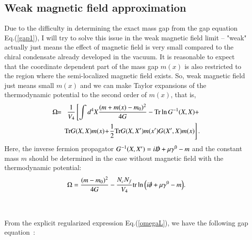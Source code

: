 \documentclass[aps,prd,amsmath,two column,amssymb,showpacs]{revtex4}
\begin{document}
\subsection{Weak magnetic field approximation}\label{WB}
Due to the difficulty in determining the exact mass gap from the gap equation Eq.(\ref{gap1}), I will try to solve this issue in the weak magnetic field limit -- "weak" actually just means the effect of magnetic field is very small compared to the chiral condensate already developed in the vacuum. It is reasonable to expect that the coordinate dependent part of the mass gap $m(x)$ is also restricted to the region where the semi-localized magnetic field exists. So, weak magnetic field just means small $m(x)$ and we can make Taylor expansions of the thermodynamic potential to the second order of $m(x)$, that is,
\begin{eqnarray}
\Omega\!\!&=&\!\!{1\over V_4}\left[\int d^4X{(m+m(x)-m_0)^2\over4G}-{\rm Tr}\ln G^{-1}(X,X)+\right.\nonumber\\
&&\!\!\!\!\left.{\rm Tr}G(X,X)m(x)\!+\!{1\over2}{\rm Tr}G(X,X')m(x')G(X',X)m(x)\right].
\end{eqnarray}
Here, the inverse fermion propagator $G^{-1}(X,X')=i\slashed{D}+\mu\gamma^0-m$ and the constant mass $m$ should be determined in the case without magnetic field with the thermodynamic potential:
\begin{eqnarray}
\Omega={(m-m_0)^2\over4G}-{N_cN_f\over V_4}{\rm tr}\ln\Big(i\slashed{\partial}+\mu\gamma^0-m\Big).\\\nonumber
\\\nonumber
\end{eqnarray} 
From the explicit regularized expression Eq.(\ref{omegaL}), we have the following gap equation~\cite{Cao:2015dya}:
\end{document}
